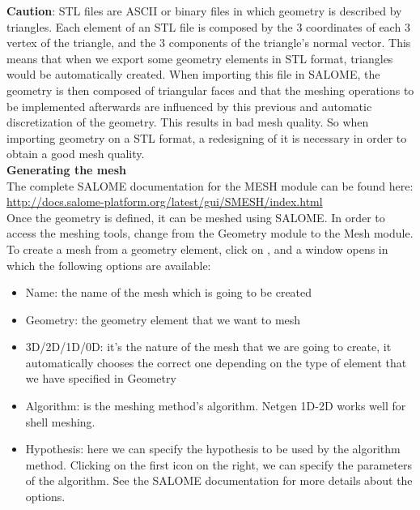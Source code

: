 \documentclass[12pt]{memoir}
\begin{document}
\textbf{Caution}: STL files are ASCII or binary 
files in which geometry is described by triangles. 
Each element of an STL file is composed by the 3 
coordinates of each 3 vertex of the triangle, 
and the 3 components of the triangle’s normal vector. 
This means that when we export some geometry 
elements in STL format, triangles would be automatically created. 
When importing this file in SALOME, the geometry is then 
composed of triangular faces and that the meshing operations 
to be implemented afterwards are influenced by this previous 
and automatic discretization of the geometry.
This results in bad mesh quality.
So when importing geometry on a STL format, a redesigning of it is necessary 
in order to obtain a good mesh quality.\\

\textbf{Generating the mesh}\\

The complete SALOME documentation for the MESH module can be found here:\\
\url{http://docs.salome-platform.org/latest/gui/SMESH/index.html}\\

Once the geometry is defined, it can be meshed using SALOME.
In order to access the meshing tools, change from the Geometry 
module to the Mesh module.
To create a mesh from a geometry element, click on , 
and a window opens in which the following options are available:
\begin{itemize}
\item Name: the name of the mesh which is going to be created
\item Geometry: the geometry element that we want to mesh
\item 3D/2D/1D/0D: it’s the nature of the mesh that we are 
going to create, it automatically chooses the correct one 
depending on the type of element that we have specified in Geometry
\item Algorithm: is the meshing method’s algorithm. 
Netgen 1D-2D works well for shell meshing.
\item Hypothesis: here we can specify the hypothesis to be used 
by the algorithm method. Clicking on the first icon on the right, 
we can specify the parameters of the algorithm. See the SALOME 
documentation for more details about the options.
\end{itemize}
\end{document}
